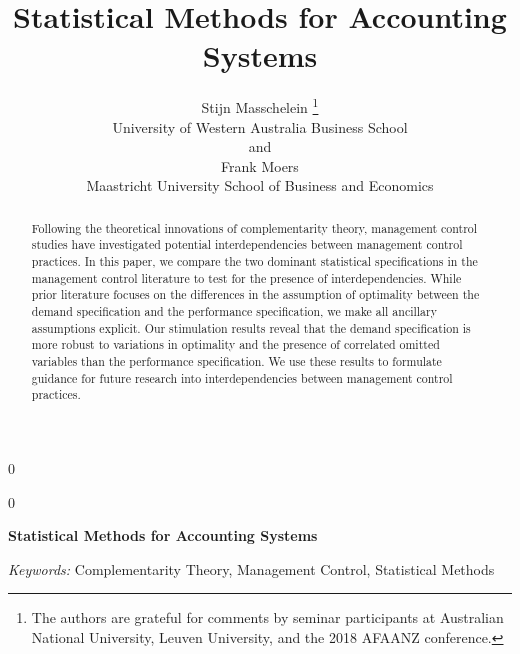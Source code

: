 \documentclass[12pt]{article}
\newcommand{\blind}{0}
\begin{document}
\def\spacingset#1{\renewcommand{\baselinestretch}%
{#1}\small\normalsize} \spacingset{1}


\blind
{
  \title{\bf Statistical Methods for Accounting Systems}

  \author{
        Stijn Masschelein \thanks{The authors are grateful for comments by seminar participants at
Australian National University, Leuven University, and the 2018 AFAANZ
conference.} \\
    University of Western Australia Business School\\
     and \\     Frank Moers \\
    Maastricht University School of Business and Economics\\
      }
  \maketitle
} \fi

\blind
{
  \bigskip
  \bigskip
  \bigskip
  \begin{center}
    {\LARGE\bf Statistical Methods for Accounting Systems}
  \end{center}
  \medskip
} \fi

\bigskip
\begin{abstract}
Following the theoretical innovations of complementarity theory, management control studies have investigated potential interdependencies between management control practices. In this paper, we compare the two dominant statistical specifications in the management control literature to test for the presence of interdependencies. While prior literature focuses on the differences in the assumption of optimality between the demand specification and the performance specification, we make all ancillary assumptions explicit. Our stimulation results reveal that the demand specification is more robust to variations in optimality and the presence of correlated omitted variables than the performance specification. We use these results to formulate guidance for future research into interdependencies between management control practices.
\end{abstract}

\noindent%
{\it Keywords:} Complementarity Theory, Management Control, Statistical Methods
\vfill

\newpage

\spacingset{1.15}
\end{document}
